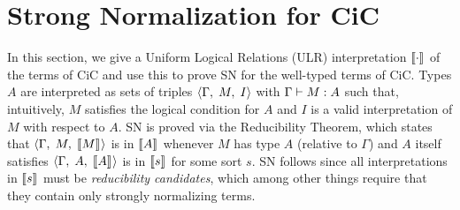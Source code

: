 \documentclass{article}
\begin{document}



\section{Strong Normalization for CiC}
\label{sec:cic-sn}

In this section, we give a Uniform Logical Relations (ULR)
interpretation $\llbracket \cdot \rrbracket^{}$ of the terms of CiC and use this to
prove SN for the well-typed terms of CiC. Types $A$ are interpreted as
sets of triples $\langle \Gamma ,\; M, \; I\rangle$ with $\Gamma \vdash M : A$ such that,
intuitively, $M$ satisfies the logical condition for $A$ and $I$ is a
valid interpretation of $M$ with respect to $A$. SN is proved via the
Reducibility Theorem, which states that
$\langle \Gamma ,\; M, \; \llbracket M \rrbracket^{}\rangle$ is in $\llbracket A \rrbracket^{}$ whenever $M$
has type $A$ (relative to $\Gamma$) and $A$ itself satisfies
$\langle \Gamma ,\; A, \; \llbracket A \rrbracket^{}\rangle$ is in $\llbracket s \rrbracket^{}$ for some
sort $s$. SN follows since all interpretations in $\llbracket s \rrbracket^{}$ must
be \emph{reducibility candidates}, which among other things require
that they contain only strongly normalizing terms.
\end{document}
